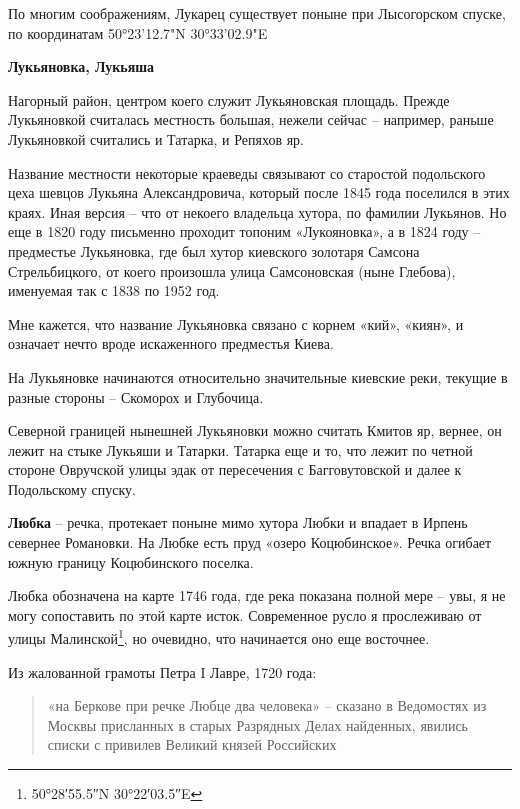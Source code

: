 По многим соображениям, Лукарец существует поныне при Лысогорском спуске, по координатам 50°23'12.7"N 30°33'02.9"E\\


\newpage


\textbf{Лукьяновка, Лукьяша}

Нагорный район, центром коего служит Лукьяновская площадь. Прежде Лукьяновкой считалась местность большая, нежели сейчас – например, раньше Лукьяновкой считались и Татарка, и Репяхов яр. 

Название местности некоторые краеведы связывают со старостой подольского цеха шевцов Лукьяна Александровича, который после 1845 года поселился в этих краях. Иная версия – что от некоего владельца хутора, по фамилии Лукьянов. Но еще в 1820 году письменно проходит топоним «Лукояновка», а в 1824 году – предместье Лукьяновка, где был хутор киевского золотаря Самсона Стрельбицкого, от коего произошла улица Самсоновская (ныне Глебова), именуемая так с 1838 по 1952 год.

Мне кажется, что название Лукьяновка связано с корнем «кий», «киян», и означает нечто вроде искаженного предместья Киева.

На Лукьяновке начинаются относительно значительные киевские реки, текущие в разные стороны – Скоморох и Глубочица.

Северной границей нынешней Лукьяновки можно считать Кмитов яр, вернее, он лежит на стыке Лукьяши и Татарки. Татарка еще и то, что лежит по четной стороне Овручской улицы эдак от пересечения с Багговутовской и далее к Подольскому спуску.\\

\medskip



\textbf{Любка} – речка, протекает поныне мимо хутора Любки и впадает в Ирпень севернее Романовки. На Любке есть пруд «озеро Коцюбинское». Речка огибает южную границу Коцюбинского поселка.

Любка обозначена на карте 1746 года, где река показана полной мере – увы, я не могу сопоставить по этой карте исток. Современное русло я прослеживаю от улицы Малинской\footnote{50°28′55.5″N 30°22′03.5″E}, но очевидно, что начинается оно еще восточнее. 

Из жалованной грамоты Петра I Лавре, 1720 года:

\begin{quotation}
«на Беркове при речке Любце два человека» – сказано в Ведомостях из Москвы присланных в старых Разрядных Делах найденных, явились списки с привилев Великий князей Российских
\end{quotation} 

